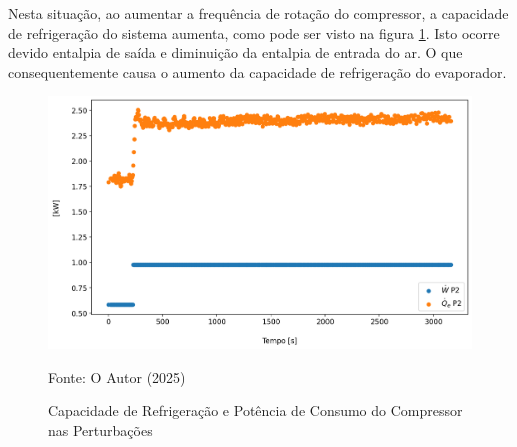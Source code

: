 Nesta situação, ao aumentar a frequência de rotação do compressor, a capacidade de refrigeração do sistema aumenta, como pode ser visto na figura \ref{fig:Capacidade de Resfriamento e Potência de Consumo do Compressor P2}. Isto ocorre devido entalpia de saída e diminuição da entalpia de entrada do ar. O que consequentemente causa o aumento da capacidade de refrigeração do evaporador.
\newpage
\begin{figure}[h]
    \centering
    \includegraphics[width=1\linewidth]{FigurasdoTexto/Qe e W Perturbação Rot.png}
    \caption{Capacidade de Refrigeração e Potência de Consumo do Compressor nas Perturbações}
    \label{fig:Capacidade de Resfriamento e Potência de Consumo do Compressor P2}
    {\footnotesize Fonte: O Autor (2025)}
\end{figure}

